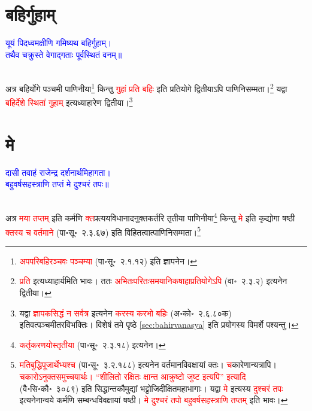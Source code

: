 \section[बहिर्गुहाम्]{बहिर्गुहाम्‌}
\centering\textcolor{blue}{यूयं पिदध्वमक्षीणि गमिष्यथ बहिर्गुहाम्।\nopagebreak\\
तथैव चक्रुस्ते वेगाद्गताः पूर्वस्थितं वनम्॥}\nopagebreak\\
\\
\begin{sloppypar}\justifying\noindent\hspace{10mm} अत्र बहिर्योगे पञ्चमी पाणिनीया\footnote{\textcolor{red}{अपपरिबहिरञ्चवः पञ्चम्या} (पा॰सू॰~२.१.१२) इति ज्ञापनेन।} किन्तु \textcolor{red}{गुहां प्रति बहिः} इति प्रति\-योगे द्वितीयाऽपि पाणिनि\-सम्मता।\footnote{\textcolor{red}{प्रति} इत्यध्याहार्यमिति भावः। ततः \textcolor{red}{अभितः\-परितः\-समया\-निकषा\-हाप्रति\-योगेऽपि} (वा॰~२.३.२) इत्यनेन द्वितीया।} यद्वा \textcolor{red}{बहिर्देशे स्थितां गुहाम्‌} इत्यध्याहारेण द्वितीया।\footnote{यद्वा \textcolor{red}{ज्ञापकसिद्धं न सर्वत्र} इत्यनेन \textcolor{red}{करस्य करभो बहिः} (अ॰को॰~२.६.८०क) इतिवत्पञ्चमीतर\-विभक्तिः। विशेषं \pageref{sec:bahirvanasya}तमे पृष्ठे \ref{sec:bahirvanasya}  इति प्रयोगस्य विमर्शे पश्यन्तु।}\end{sloppypar}
\section[मे]{मे}
\centering\textcolor{blue}{दासी तवाहं राजेन्द्र दर्शनार्थमिहागता।\nopagebreak\\
बहुवर्षसहस्त्राणि तप्तं मे दुश्चरं तपः॥}\nopagebreak\\
\\
\begin{sloppypar}\justifying\noindent\hspace{10mm} अत्र \textcolor{red}{मया तप्तम्‌} इति कर्मणि \textcolor{red}{क्त}\-प्रत्यय\-विधानादनुक्त\-कर्तरि तृतीया पाणिनीया\footnote{\textcolor{red}{कर्तृ\-करणयोस्तृतीया} (पा॰सू॰~२.३.१८) इत्यनेन।} किन्तु \textcolor{red}{मे} इति कृद्योगा षष्ठी \textcolor{red}{क्तस्य च वर्तमाने} (पा॰सू॰~२.३.६७) इति विहितत्वात्पाणिनि\-सम्मता।\footnote{\textcolor{red}{मति\-बुद्धि\-पूजार्थेभ्यश्च} (पा॰सू॰~३.२.१८८) इत्यनेन वर्तमान\-विवक्षायां क्तः। \textcolor{red}{च}कारेणान्यत्रापि। \textcolor{red}{चकारोऽनुक्त\-समुच्चयार्थः। “शीलितो रक्षितः क्षान्त आक्रुष्टो जुष्ट इत्यपि” इत्यादि} (वै॰सि॰कौ॰~३०८९) इति सिद्धान्त\-कौमुद्यां भट्टोजि\-दीक्षित\-महाभागाः। यद्वा \textcolor{red}{मे} इत्यस्य \textcolor{red}{दुश्चरं तपः} इत्यनेनान्वये कर्मणि सम्बन्ध\-विवक्षायां षष्ठी। \textcolor{red}{मे दुश्चरं तपो बहुवर्षसहस्त्राणि तप्तम्‌} इति भावः।}\end{sloppypar}
